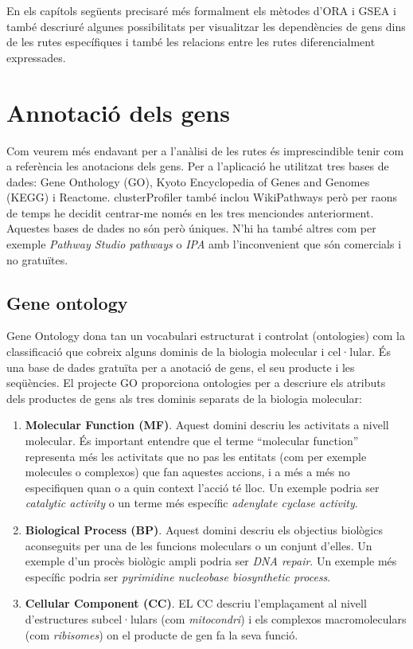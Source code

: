 \begin{itemize}
En els capítols següents precisaré més formalment els mètodes d'\gls{ORA} i \gls{GSEA} i també descriuré algunes possibilitats per visualitzar les dependències de gens dins de les rutes específiques i també les relacions entre les rutes diferencialment expressades.

\end{itemize}


\section{Annotació dels gens}

Com veurem més endavant per a l’anàlisi de les rutes és imprescindible tenir com a referència les anotacions dels gens. Per a l’aplicació he utilitzat tres bases de dades: Gene Onthology (GO), Kyoto Encyclopedia of Genes and Genomes (KEGG) i Reactome. clusterProfiler també inclou WikiPathways però per raons de temps he decidit centrar-me només en les tres menciondes anteriorment. Aquestes bases de dades no són però úniques. N'hi ha també altres com per exemple \textit{Pathway Studio pathways} o \textit{IPA} amb l’inconvenient que són comercials i no gratuïtes. 

\subsection{Gene ontology}
Gene Ontology \cite{gene2004gene} dona tan un vocabulari estructurat i controlat (ontologies) com la classificació que cobreix alguns dominis de la biologia molecular i cel·lular. És una base de dades gratuïta per a anotació de gens, el seu producte i les seqüències. El projecte \gls{GO} proporciona ontologies per a descriure els atributs dels productes de gens als tres dominis separats de la biologia molecular:
\begin{enumerate}
\item \textbf{Molecular Function (MF)}. Aquest domini descriu les activitats a nivell molecular. És important entendre que el terme ``molecular function'' representa més les activitats que no pas les entitats (com per exemple molecules o complexos) que fan aquestes accions, i a més a més no especifiquen quan o a quin context l'acció té lloc. Un exemple podria ser \textit{catalytic activity} o un terme més específic \textit{adenylate cyclase activity}.
\item \textbf{Biological Process (BP)}. Aquest domini descriu els objectius biològics aconseguits per una de les funcions moleculars o un conjunt d’elles. Un exemple d'un procès biològic ampli podria ser \textit{DNA repair}. Un exemple més específic podria ser \textit{pyrimidine nucleobase biosynthetic process}. 
\item \textbf{Cellular Component (CC)}. EL CC descriu l'emplaçament al nivell d'estructures subcel·lulars (com \textit{mitocondri}) i els complexos macromoleculars (com \textit{ribisomes}) on el producte de gen fa la seva funció.
\end{enumerate}

